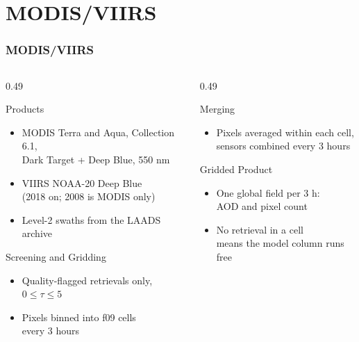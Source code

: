 \section{MODIS/VIIRS}
\begin{frame}[t]
\frametitle{MODIS/VIIRS}
\footnotesize
\begin{columns}[T]
\begin{column}{0.49\textwidth}
\begin{block}{Products}
\begin{itemize}
  \item MODIS Terra and Aqua, Collection 6.1,\\Dark Target + Deep Blue, 550 nm
  \item VIIRS NOAA-20 Deep Blue\\(2018 on; 2008 is MODIS only)
  \item Level-2 swaths from the LAADS archive
\end{itemize}
\end{block}
\begin{block}{Screening and Gridding}
\begin{itemize}
  \item Quality-flagged retrievals only,\\$0 \le \tau \le 5$
  \item Pixels binned into f09 cells\\every 3 hours
\end{itemize}
\end{block}
\end{column}
\begin{column}{0.49\textwidth}
\begin{block}{Merging}
\begin{itemize}
  \item Pixels averaged within each cell,\\sensors combined every 3 hours
\end{itemize}
\end{block}
\begin{block}{Gridded Product}
\begin{itemize}
  \item One global field per 3 h:\\AOD and pixel count
  \item No retrieval in a cell\\means the model column runs free
\end{itemize}
\end{block}
\end{column}
\end{columns}
\end{frame}
